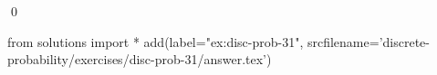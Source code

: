 
\begin{ex} 
  \label{ex:disc-prob-31}
  
  \qed
\end{ex} 
\begin{python0}
from solutions import *
add(label="ex:disc-prob-31",
    srcfilename='discrete-probability/exercises/disc-prob-31/answer.tex') 
\end{python0}
